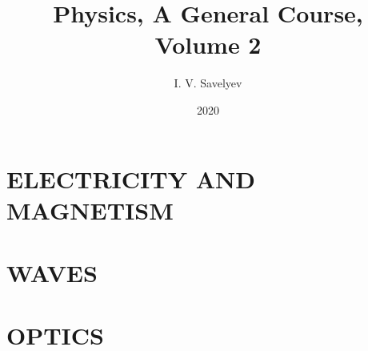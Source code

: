 \documentclass[11pt, twoside, fleqn]{book}
\title{Physics, A General Course, Volume 2}
\author{I. V. Savelyev}
\date{2020}
\numberwithin{equation}{chapter}
\begin{document}
\setlength{\abovedisplayskip}{3pt}
\setlength{\belowdisplayskip}{3pt}
\setlength{\abovedisplayshortskip}{3pt}
\setlength{\belowdisplayshortskip}{3pt}

\frontmatter


\cleardoublepage

\cleardoublepage

\cleardoublepage
{\hypersetup{linkcolor=black!80}
	\tableofcontents
}
\cleardoublepage

\mainmatter

% 

\part{ELECTRICITY AND MAGNETISM}\label{part:A}
\cleardoublepage

\cleardoublepage

\cleardoublepage

\cleardoublepage

\cleardoublepage

\cleardoublepage

\cleardoublepage

\cleardoublepage

\cleardoublepage

\cleardoublepage

\cleardoublepage

\cleardoublepage

\cleardoublepage

\cleardoublepage

\part{WAVES}\label{part:B}
\cleardoublepage

\cleardoublepage

\cleardoublepage

\part{OPTICS}\label{part:C}
\cleardoublepage

\cleardoublepage

\cleardoublepage

\cleardoublepage

\cleardoublepage

\cleardoublepage

\cleardoublepage


\cleardoublepage

\end{document}

